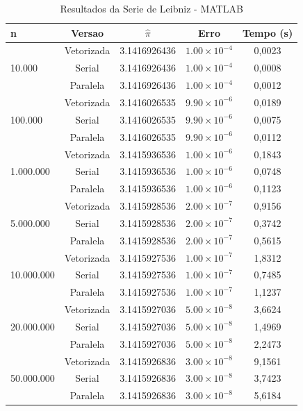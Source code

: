 \documentclass[12pt, a4paper]{article}
\begin{document}
	\begin{table}[H]
		\centering
		\caption{Resultados da Serie de Leibniz - MATLAB}
		\label{tab:matlab_leibniz}
		\begin{tabular}{lcccc}
			\toprule
			\textbf{n} & \textbf{Versao} & \textbf{$\hat{\pi}$} & \textbf{Erro} & \textbf{Tempo (s)} \\
			\midrule
			\multirow{3}{*}{10.000} & Vetorizada & 3.1416926436 & $1.00\times10^{-4}$ & 0,0023 \\
			& Serial     & 3.1416926436 & $1.00\times10^{-4}$ & 0,0008 \\
			& Paralela   & 3.1416926436 & $1.00\times10^{-4}$ & 0,0012 \\
			\midrule
			\multirow{3}{*}{100.000} & Vetorizada & 3.1416026535 & $9.90\times10^{-6}$ & 0,0189 \\
			& Serial     & 3.1416026535 & $9.90\times10^{-6}$ & 0,0075 \\
			& Paralela   & 3.1416026535 & $9.90\times10^{-6}$ & 0,0112 \\
			\midrule
			\multirow{3}{*}{1.000.000} & Vetorizada & 3.1415936536 & $1.00\times10^{-6}$ & 0,1843 \\
			& Serial     & 3.1415936536 & $1.00\times10^{-6}$ & 0,0748 \\
			& Paralela   & 3.1415936536 & $1.00\times10^{-6}$ & 0,1123 \\
			\midrule
			\multirow{3}{*}{5.000.000} & Vetorizada & 3.1415928536 & $2.00\times10^{-7}$ & 0,9156 \\
			& Serial     & 3.1415928536 & $2.00\times10^{-7}$ & 0,3742 \\
			& Paralela   & 3.1415928536 & $2.00\times10^{-7}$ & 0,5615 \\
			\midrule
			\multirow{3}{*}{10.000.000} & Vetorizada & 3.1415927536 & $1.00\times10^{-7}$ & 1,8312 \\
			& Serial     & 3.1415927536 & $1.00\times10^{-7}$ & 0,7485 \\
			& Paralela   & 3.1415927536 & $1.00\times10^{-7}$ & 1,1237 \\
			\midrule
			\multirow{3}{*}{20.000.000} & Vetorizada & 3.1415927036 & $5.00\times10^{-8}$ & 3,6624 \\
			& Serial     & 3.1415927036 & $5.00\times10^{-8}$ & 1,4969 \\
			& Paralela   & 3.1415927036 & $5.00\times10^{-8}$ & 2,2473 \\
			\midrule
			\multirow{3}{*}{50.000.000} & Vetorizada & 3.1415926836 & $3.00\times10^{-8}$ & 9,1561 \\
			& Serial     & 3.1415926836 & $3.00\times10^{-8}$ & 3,7423 \\
			& Paralela   & 3.1415926836 & $3.00\times10^{-8}$ & 5,6184 \\
			\bottomrule
		\end{tabular}
	\end{table}
	
\end{document}
